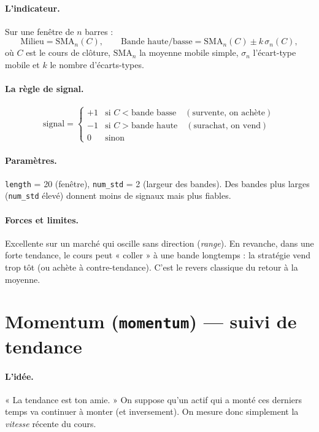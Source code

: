 \documentclass[11pt,a4paper]{article}
\newcommand{\code}[1]{\texttt{#1}}
\begin{document}
\paragraph{L'indicateur.} Sur une fenêtre de $n$ barres :
\[
  \text{Milieu} = \text{SMA}_n(C), \qquad
  \text{Bande haute/basse} = \text{SMA}_n(C) \pm k \,\sigma_n(C),
\]
où $C$ est le cours de clôture, $\text{SMA}_n$ la moyenne mobile simple,
$\sigma_n$ l'écart-type mobile et $k$ le nombre d'écarts-types.

\paragraph{La règle de signal.}
\[
  \text{signal} =
  \begin{cases}
    +1 & \text{si } C < \text{bande basse} \quad(\text{survente, on achète})\\
    -1 & \text{si } C > \text{bande haute} \quad(\text{surachat, on vend})\\
    0  & \text{sinon}
  \end{cases}
\]

\paragraph{Paramètres.} \code{length} = 20 (fenêtre), \code{num\_std} = 2
(largeur des bandes). Des bandes plus larges (\code{num\_std} élevé) donnent
moins de signaux mais plus fiables.

\paragraph{Forces et limites.} Excellente sur un marché qui oscille sans
direction (\emph{range}). En revanche, dans une forte tendance, le cours peut
« coller » à une bande longtemps : la stratégie vend trop tôt (ou achète à
contre-tendance). C'est le revers classique du retour à la moyenne.

\section{Momentum \textnormal{(\code{momentum})} --- suivi de tendance}

\paragraph{L'idée.} « La tendance est ton amie. » On suppose qu'un actif qui a
monté ces derniers temps va continuer à monter (et inversement). On mesure donc
simplement la \emph{vitesse} récente du cours.
\end{document}
